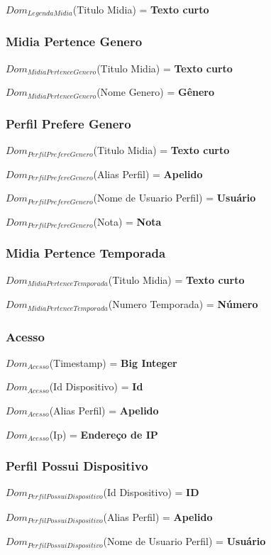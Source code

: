 \documentclass[12pt,a4paper]{article}
\newcommand{\createdomain}[3]{
    $Dom_{#1}$(#2) = {\bf #3}
}
\begin{document}
        \createdomain{Legenda Midia}{Titulo Midia}{Texto curto}


    \subsubsection{Midia Pertence Genero}
        \createdomain{Midia Pertence Genero}{Titulo Midia}{Texto curto}

        \createdomain{Midia Pertence Genero}{Nome Genero}{Gênero}


    \subsubsection{Perfil Prefere Genero}
        \createdomain{Perfil Prefere Genero}{Titulo Midia}{Texto curto}

        \createdomain{Perfil Prefere Genero}{Alias Perfil}{Apelido}

        \createdomain{Perfil Prefere Genero}{Nome de Usuario Perfil}{Usuário}

        \createdomain{Perfil Prefere Genero}{Nota}{Nota}


    \subsubsection{Midia Pertence Temporada}
        \createdomain{Midia Pertence Temporada}{Titulo Midia}{Texto curto}

        \createdomain{Midia Pertence Temporada}{Numero Temporada}{Número}


    \subsubsection{Acesso}
        \createdomain{Acesso}{Timestamp}{Big Integer}

        \createdomain{Acesso}{Id Dispositivo}{Id}

        \createdomain{Acesso}{Alias Perfil}{Apelido}

        \createdomain{Acesso}{Ip}{Endereço de IP}


    \subsubsection{Perfil Possui Dispositivo}
        \createdomain{Perfil Possui Dispositivo}{Id Dispositivo}{ID}

        \createdomain{Perfil Possui Dispositivo}{Alias Perfil}{Apelido}

        \createdomain{Perfil Possui Dispositivo}{Nome de Usuario Perfil}{Usuário}
\end{document}
